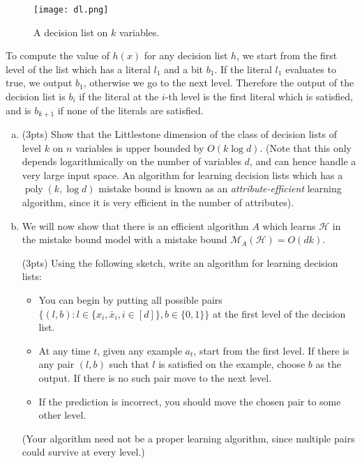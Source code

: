 \documentclass[11pt]{article}
\DeclareMathOperator{\poly}{poly}
\newcommand{\calH}{{\mathcal{H}}}
\newcommand{\calM}{{\mathcal{M}}}
\newcommand{\blue}[1]{{\color{blue}#1}}
\begin{document}
\begin{figure}[h]
    \centering
    \texttt{[image: dl.png]}
    \caption{A decision list on $k$ variables.}
    \label{fig:dl}
\end{figure}

To compute the value of $h(x)$ for any decision list $h$, we start from the first level of the list which has a literal $l_1$ and a bit $b_1$. If the literal $l_1$ evaluates to true, we output $b_1$, otherwise we go to the next level. Therefore the output of the decision list is $b_i$ if the literal at the $i$-th level is the first literal which is satisfied, and is $b_{k+1}$ if none of the literals are satisfied.

\begin{enumerate}[(a)]
    \item (\blue{3pts}) Show that the Littlestone dimension of the class of decision lists of level $k$ on $n$ variables is upper bounded by $O(k\log d)$. (Note that this only depends logarithmically on the number of variables $d$, and can hence handle a very large input space. An algorithm for learning decision lists which has a $\poly(k, \log d)$ mistake bound is known as an \emph{attribute-efficient} learning algorithm, since it is very efficient in the number of attributes).
    \item We will now show that there is an efficient algorithm $A$ which learns $\calH$ in the mistake bound model with a mistake bound $\calM_A(\calH)=O(dk)$. 
    
    (\blue{3pts}) Using the following sketch, write an algorithm for learning decision lists: 
    \begin{itemize}
        \item You can begin by putting all possible pairs $\{(l,b):l \in \{x_i,\bar{x}_i, i\in [d]\}, b \in \{0,1\}\}$ at the first level of the decision list.
        \item At any time $t$, given any example $a_t$, start from the first level. If there is any pair $(l,b)$ such that $l$ is satisfied on the example, choose $b$ as the output. If there is no such pair move to the next level. 
        \item If the prediction is incorrect, you should move the chosen pair to some other level.
    \end{itemize}
    
    (Your algorithm need not be a proper learning algorithm, since multiple pairs could survive at every level.)
    

\end{enumerate}
\end{document}
